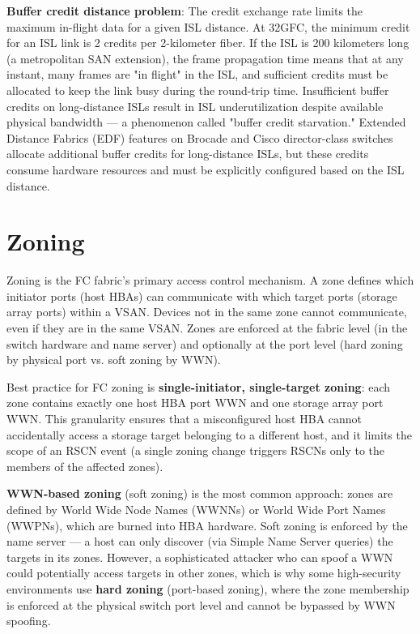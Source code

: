 \textbf{Buffer credit distance problem}: The credit exchange rate limits the maximum in-flight data for a given ISL distance. At 32GFC, the minimum credit for an ISL link is 2 credits per 2-kilometer fiber. If the ISL is 200 kilometers long (a metropolitan SAN extension), the frame propagation time means that at any instant, many frames are "in flight" in the ISL, and sufficient credits must be allocated to keep the link busy during the round-trip time. Insufficient buffer credits on long-distance ISLs result in ISL underutilization despite available physical bandwidth --- a phenomenon called "buffer credit starvation." Extended Distance Fabrics (EDF) features on Brocade and Cisco director-class switches allocate additional buffer credits for long-distance ISLs, but these credits consume hardware resources and must be explicitly configured based on the ISL distance.

\section{Zoning}
Zoning is the FC fabric's primary access control mechanism. A zone defines which initiator ports (host HBAs) can communicate with which target ports (storage array ports) within a VSAN. Devices not in the same zone cannot communicate, even if they are in the same VSAN. Zones are enforced at the fabric level (in the switch hardware and name server) and optionally at the port level (hard zoning by physical port vs. soft zoning by WWN).

Best practice for FC zoning is \textbf{single-initiator, single-target zoning}: each zone contains exactly one host HBA port WWN and one storage array port WWN. This granularity ensures that a misconfigured host HBA cannot accidentally access a storage target belonging to a different host, and it limits the scope of an RSCN event (a single zoning change triggers RSCNs only to the members of the affected zones).

\textbf{WWN-based zoning} (soft zoning) is the most common approach: zones are defined by World Wide Node Names (WWNNs) or World Wide Port Names (WWPNs), which are burned into HBA hardware. Soft zoning is enforced by the name server --- a host can only discover (via Simple Name Server queries) the targets in its zones. However, a sophisticated attacker who can spoof a WWN could potentially access targets in other zones, which is why some high-security environments use \textbf{hard zoning} (port-based zoning), where the zone membership is enforced at the physical switch port level and cannot be bypassed by WWN spoofing.

